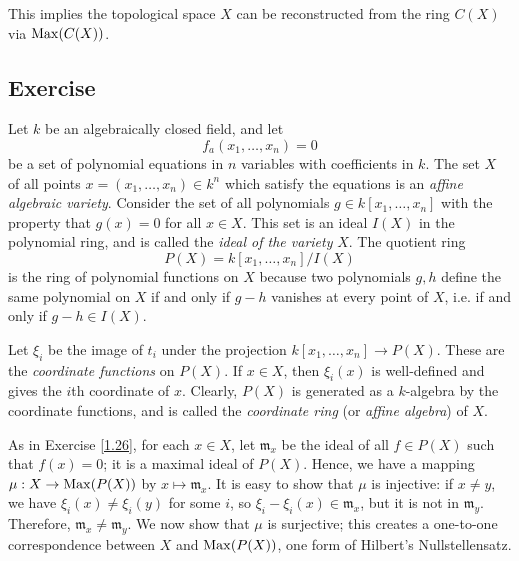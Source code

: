 \begin{remark}
This implies the topological space $X$ can be reconstructed from the ring $C(X)$ via $\operatorname{Max} (C(X))$.
\end{remark}

\subsection{Exercise}\label{1.27}

Let $k$ be an algebraically closed field, and let
$$f_a (x_1,\ldots,x_n) = 0$$
be a set of polynomial equations in $n$ variables with coefficients in $k$. The set $X$ of all points $x = (x_1,\ldots,x_n) \in k^n$ which satisfy the equations is an {\it affine algebraic variety}.
Consider the set of all polynomials $g \in k[x_1,\ldots,x_n]$ with the property that $g(x)=0$ for all $x \in X$. This set is an ideal $I(X)$ in the polynomial ring, and is called the {\it ideal of the variety} 
$X$. The quotient ring
$$P(X) = k[x_1,\ldots,x_n] / I(X)$$
is the ring of polynomial functions on $X$ because two polynomials $g,h$ define the same polynomial on $X$ if and only if $g - h$ vanishes at every point of $X$, i.e. if and only if $g-h \in I(X)$.

Let $\xi_i$ be the image of $t_i$ under the projection $k[x_1,\ldots,x_n] \to P(X)$. These are the {\it coordinate functions} on $P(X)$. If $x \in X$, then $\xi_i(x)$ is well-defined and gives the
$i$th coordinate of $x$. Clearly, $P(X)$ is generated as a $k$-algebra by the coordinate functions, and is called the {\it coordinate ring} (or {\it affine algebra}) of $X$.

As in Exercise \ref{1.26}, for each $x \in X$, let $\mathfrak{m}_x$ be the ideal of all $f \in P(X)$ such that $f(x) = 0$; it is a maximal ideal of $P(X)$. Hence, we have a mapping $\mu : X \to \operatorname{Max}(P(X))$
by $x \mapsto \mathfrak{m}_x$. It is easy to show that $\mu$ is injective: if $x \neq y$, we have $\xi_i(x) \neq \xi_i(y)$ for some $i$, so $\xi_i - \xi_i(x) \in \mathfrak{m}_x$, but it is not in $\mathfrak{m}_y$. 
Therefore, $\mathfrak{m}_x \neq \mathfrak{m}_y$. We now show that $\mu$ is surjective; this creates a one-to-one correspondence between $X$ and $\operatorname{Max}(P(X))$, one form of Hilbert's Nullstellensatz.

